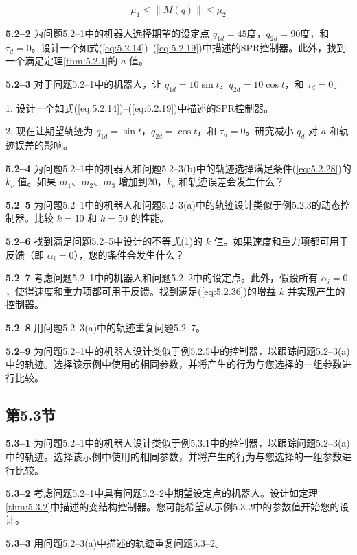 \documentclass[UTF8,12pt,a4paper]{ctexart}
\begin{document}
\begin{equation}
\mu_1 \leq \|M(q)\| \leq \mu_2
\end{equation}

\textbf{5.2--2} 为问题5.2--1中的机器人选择期望的设定点 $q_{1d} = 45$度，$q_{2d} = 90$度，和 $\tau_d = 0$。设计一个如式(\ref{eq:5.2.14})--(\ref{eq:5.2.19})中描述的SPR控制器。此外，找到一个满足定理\ref{thm:5.2.1}的 $a$ 值。

\textbf{5.2--3} 对于问题5.2--1中的机器人，让 $q_{1d} = 10\sin t$，$q_{2d} = 10\cos t$，和 $\tau_d = 0$。

1. 设计一个如式(\ref{eq:5.2.14})--(\ref{eq:5.2.19})中描述的SPR控制器。

2. 现在让期望轨迹为 $q_{1d} = \sin t$，$q_{2d} = \cos t$，和 $\tau_d = 0$。研究减小 $q_d$ 对 $a$ 和轨迹误差的影响。

\textbf{5.2--4} 为问题5.2--1中的机器人和问题5.2--3(b)中的轨迹选择满足条件(\ref{eq:5.2.28})的 $k_v$ 值。如果 $m_1$、$m_2$、$m_3$ 增加到20，$k_v$ 和轨迹误差会发生什么？

\textbf{5.2--5} 为问题5.2--1中的机器人和问题5.2--3(a)中的轨迹设计类似于例5.2.3的动态控制器。比较 $k = 10$ 和 $k = 50$ 的性能。

\textbf{5.2--6} 找到满足问题5.2--5中设计的不等式(1)的 $k$ 值。如果速度和重力项都可用于反馈（即 $\alpha_i = 0$），您的条件会发生什么？

\textbf{5.2--7} 考虑问题5.2--1中的机器人和问题5.2--2中的设定点。此外，假设所有 $\alpha_i = 0$，使得速度和重力项都可用于反馈。找到满足(\ref{eq:5.2.36})的增益 $k$ 并实现产生的控制器。

\textbf{5.2--8} 用问题5.2--3(a)中的轨迹重复问题5.2--7。

\textbf{5.2--9} 为问题5.2--1中的机器人设计类似于例5.2.5中的控制器，以跟踪问题5.2--3(a)中的轨迹。选择该示例中使用的相同参数，并将产生的行为与您选择的一组参数进行比较。

\subsection*{第5.3节}

\textbf{5.3--1} 为问题5.2--1中的机器人设计类似于例5.3.1中的控制器，以跟踪问题5.2--3(a)中的轨迹。选择该示例中使用的相同参数，并将产生的行为与您选择的一组参数进行比较。

\textbf{5.3--2} 考虑问题5.2--1中具有问题5.2--2中期望设定点的机器人。设计如定理\ref{thm:5.3.2}中描述的变结构控制器。您可能希望从示例5.3.2中的参数值开始您的设计。

\textbf{5.3--3} 用问题5.2--3(a)中描述的轨迹重复问题5.3--2。
\end{document}
